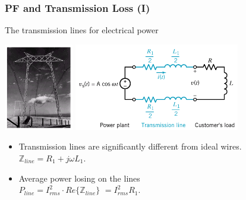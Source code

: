 \documentclass{beamer}
\begin{document}

\begin{frame}[fragile]
\frametitle{PF and Transmission Loss (I)}

The transmission lines for electrical power

\includegraphics[height=1.5in]{src/TransmissionLines.png}
\includegraphics[height=1.5in]{src/TransmissionLinesCCT.png}


%
%
\begin{itemize}
\item Transmission lines are significantly different from ideal wires.
\\ $\mathbb{Z}_{line} = R_1 + j \omega L_1$.
\item Average power losing on the lines
\\ $P_{line} = I_{rms}^2 \cdot Re\{ \mathbb{Z}_{line} \}$
$=I_{rms}^2 R_1$.
\end{itemize}

\end{frame}

\end{document}
